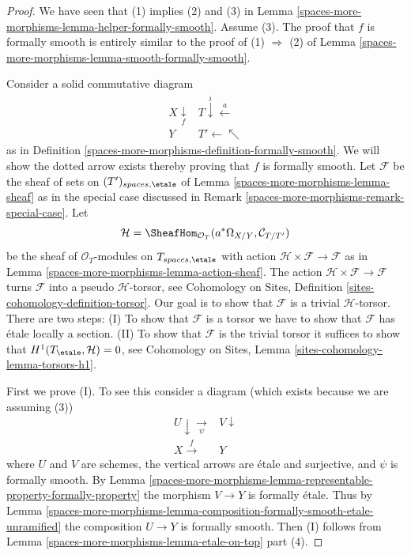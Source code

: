 \begin{proof}
We have seen that (1) implies (2) and (3) in
Lemma \ref{spaces-more-morphisms-lemma-helper-formally-smooth}.
Assume (3).
The proof that $f$ is formally smooth is entirely similar to
the proof of (1) $\Rightarrow$ (2) of
Lemma \ref{spaces-more-morphisms-lemma-smooth-formally-smooth}.

\medskip\noindent
Consider a solid commutative diagram
$$
\begin{array}{cc}X \underset{f}{\downarrow} & T \overset{i}{\downarrow}\overset{a}{\longleftarrow} \\ Y & T' \longleftarrow\nwarrow\end{array}
$$
as in Definition \ref{spaces-more-morphisms-definition-formally-smooth}.
We will show the dotted arrow exists thereby
proving that $f$ is formally smooth.
Let $\mathcal{F}$ be the sheaf of sets on $(T')_{spaces, \etale}$ of
Lemma \ref{spaces-more-morphisms-lemma-sheaf} as in the special case discussed in
Remark \ref{spaces-more-morphisms-remark-special-case}.
Let
$$
\mathcal{H} =
\SheafHom_{\mathcal{O}_T}(a^*\Omega_{X/Y}, \mathcal{C}_{T/T'})
$$
be the sheaf of $\mathcal{O}_T$-modules on $T_{spaces, \etale}$
with action $\mathcal{H} \times \mathcal{F} \to \mathcal{F}$ as in
Lemma \ref{spaces-more-morphisms-lemma-action-sheaf}.
The action $\mathcal{H} \times \mathcal{F} \to \mathcal{F}$
turns $\mathcal{F}$ into a pseudo $\mathcal{H}$-torsor, see
Cohomology on Sites, Definition \ref{sites-cohomology-definition-torsor}.
Our goal is to show that $\mathcal{F}$ is a trivial $\mathcal{H}$-torsor.
There are two steps: (I) To show that $\mathcal{F}$ is a torsor
we have to show that $\mathcal{F}$ has \'etale locally a
section. (II) To show that $\mathcal{F}$ is the trivial torsor
it suffices to show that $H^1(T_\etale, \mathcal{H}) = 0$, see
Cohomology on Sites, Lemma \ref{sites-cohomology-lemma-torsors-h1}.

\medskip\noindent
First we prove (I). To see this consider a diagram
(which exists because we are assuming (3))
$$
\begin{array}{cc}U \downarrow\underset{\psi}{\longrightarrow} & V \downarrow \\ X \overset{f}{\longrightarrow} & Y\end{array}
$$
where $U$ and $V$ are schemes, the vertical arrows are \'etale and
surjective, and $\psi$ is formally smooth. By
Lemma \ref{spaces-more-morphisms-lemma-representable-property-formally-property}
the morphism $V \to Y$ is formally \'etale. Thus by
Lemma \ref{spaces-more-morphisms-lemma-composition-formally-smooth-etale-unramified}
the composition $U \to Y$ is formally smooth. Then (I) follows from
Lemma \ref{spaces-more-morphisms-lemma-etale-on-top} part (4).


\end{proof}
